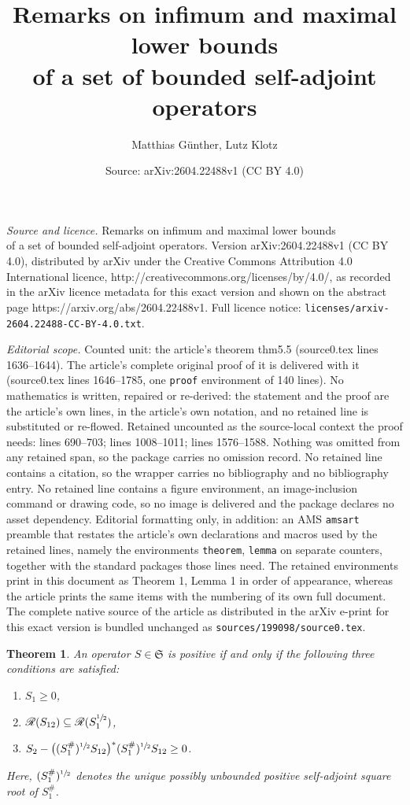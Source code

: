 \documentclass[10pt,a4paper]{amsart}
\title{Remarks on infimum and maximal lower bounds\\ of a set of bounded self-adjoint operators}
\author{Matthias G\"unther, Lutz Klotz}
\date{Source: arXiv:2604.22488v1 (CC BY 4.0)}
\newtheorem{theorem}{Theorem}
\newcommand{\frakS}{\mathfrak S}
\begin{document}
\maketitle

\noindent\emph{Source and licence.} Remarks on infimum and maximal lower bounds\\ of a set of bounded self-adjoint operators. Version arXiv:2604.22488v1 (CC BY 4.0), distributed by arXiv under the Creative Commons Attribution 4.0 International licence, http://creativecommons.org/licenses/by/4.0/, as recorded in the arXiv licence metadata for this exact version and shown on the abstract page https://arxiv.org/abs/2604.22488v1. Full licence notice: \texttt{licenses/arxiv-2604.22488-CC-BY-4.0.txt}.\par\smallskip

\noindent\textit{Editorial scope.} Counted unit: the article's theorem thm5.5 (source0.tex lines 1636--1644). The article's complete original proof of it is delivered with it (source0.tex lines 1646--1785, one \texttt{proof} environment of 140 lines). No mathematics is written, repaired or re-derived: the statement and the proof are the article's own lines, in the article's own notation, and no retained line is substituted or re-flowed.  Retained uncounted as the source-local context the proof needs: lines 690--703; lines 1008--1011; lines 1576--1588.  Nothing was omitted from any retained span, so the package carries no omission record.  No retained line contains a citation, so the wrapper carries no bibliography and no bibliography entry.  No retained line contains a figure environment, an image-inclusion command or drawing code, so no image is delivered and the package declares no asset dependency.  Editorial formatting only, in addition: an AMS \texttt{amsart} preamble that restates the article's own declarations and macros used by the retained lines, namely the environments \texttt{theorem}, \texttt{lemma} on separate counters, together with the standard packages those lines need.  The retained environments print in this document as Theorem 1, Lemma 1 in order of appearance, whereas the article prints the same items with the numbering of its own full document.  The complete native source of the article as distributed in the arXiv e-print for this exact version is bundled unchanged as \texttt{sources/199098/source0.tex}.
\begin{theorem}
  \label{thm2.2}
An operator $S\in\frakS$ is positive if and only if the following three
conditions are satisfied:
\begin{enumerate}
\item[\normalfont(i)] $S_{1}\geq0$,  
\item[(ii)] $\mathscr R(S_{12})\subseteq\mathscr R(S_{1}^{\sfrac{1}{2}})$,
\item[(iii)]
$S_{2}-\bigl((S_{1}^{\#})^{\sfrac{1}{2}}S_{12}\bigr)^{\ast}
(S_{1}^{\#})^{\sfrac{1}{2}}S_{12}\geq0$.
\end{enumerate}
Here, $(S_{1}^{\#})^{\sfrac{1}{2}}$ denotes the unique possibly unbounded
positive self-adjoint square root of $S_{1}^{\#}$.
\end{theorem}
\end{document}
